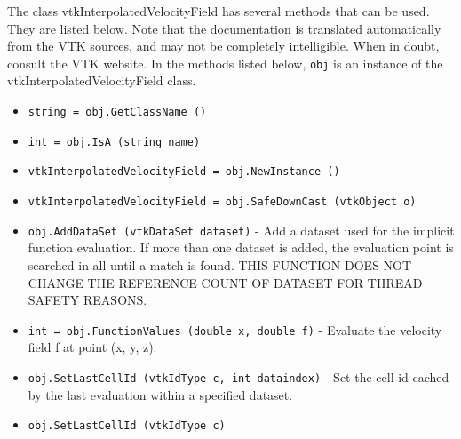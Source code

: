 The class vtkInterpolatedVelocityField has several methods that can be used.
  They are listed below.
Note that the documentation is translated automatically from the VTK sources,
and may not be completely intelligible.  When in doubt, consult the VTK website.
In the methods listed below, \verb|obj| is an instance of the vtkInterpolatedVelocityField class.
\begin{itemize}
\item  \verb|string = obj.GetClassName ()|

\item  \verb|int = obj.IsA (string name)|

\item  \verb|vtkInterpolatedVelocityField = obj.NewInstance ()|

\item  \verb|vtkInterpolatedVelocityField = obj.SafeDownCast (vtkObject o)|

\item  \verb|obj.AddDataSet (vtkDataSet dataset)| -  Add a dataset used for the implicit function evaluation. If more than
 one dataset is added, the evaluation point is searched in all until a 
 match is found. THIS FUNCTION DOES NOT CHANGE THE REFERENCE COUNT OF 
 DATASET FOR THREAD SAFETY REASONS.

\item  \verb|int = obj.FunctionValues (double x, double f)| -  Evaluate the velocity field f at point (x, y, z).

\item  \verb|obj.SetLastCellId (vtkIdType c, int dataindex)| -  Set the cell id cached by the last evaluation within a specified dataset.

\item  \verb|obj.SetLastCellId (vtkIdType c)|

\end{itemize}

